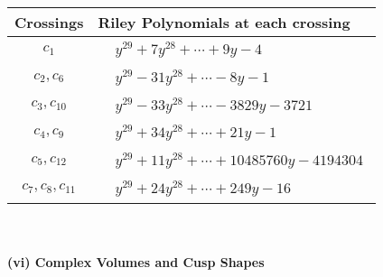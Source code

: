 \documentclass[1p]{elsarticle_modified}
\theoremstyle{definition}
\begin{document}
\begin{tabular}{m{50pt}|m{274pt}}
Crossings & \hspace{64pt}Riley Polynomials at each crossing \\
\hline $$\begin{aligned}c_{1}\end{aligned}$$&$\begin{aligned}
&y^{29}+7 y^{28}+\cdots+9 y-4
\end{aligned}$\\
\hline $$\begin{aligned}c_{2},c_{6}\end{aligned}$$&$\begin{aligned}
&y^{29}-31 y^{28}+\cdots-8 y-1
\end{aligned}$\\
\hline $$\begin{aligned}c_{3},c_{10}\end{aligned}$$&$\begin{aligned}
&y^{29}-33 y^{28}+\cdots-3829 y-3721
\end{aligned}$\\
\hline $$\begin{aligned}c_{4},c_{9}\end{aligned}$$&$\begin{aligned}
&y^{29}+34 y^{28}+\cdots+21 y-1
\end{aligned}$\\
\hline $$\begin{aligned}c_{5},c_{12}\end{aligned}$$&$\begin{aligned}
&y^{29}+11 y^{28}+\cdots+10485760 y-4194304
\end{aligned}$\\
\hline $$\begin{aligned}c_{7},c_{8},c_{11}\end{aligned}$$&$\begin{aligned}
&y^{29}+24 y^{28}+\cdots+249 y-16
\end{aligned}$\\
\hline
\end{tabular}\\~\\
\newpage\flushleft \textbf{(vi) Complex Volumes and Cusp Shapes}
\end{document}
